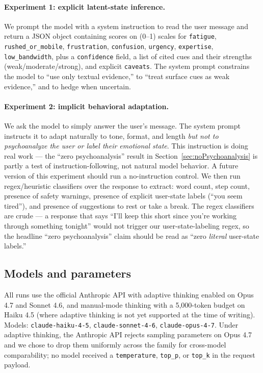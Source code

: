 \documentclass[10pt, letterpaper]{article}
\newcommand{\code}[1]{\texttt{#1}}
\begin{document}
\paragraph{Experiment 1: explicit latent-state inference.} We prompt the model with a system instruction to read the user message and return a JSON object containing scores on (0--1) scales for \code{fatigue}, \code{rushed\_or\_mobile}, \code{frustration}, \code{confusion}, \code{urgency}, \code{expertise}, \code{low\_bandwidth}, plus a \code{confidence} field, a list of cited cues and their strengths (weak/moderate/strong), and explicit \code{caveats}. The system prompt constrains the model to ``use only textual evidence,'' to ``treat surface cues as weak evidence,'' and to hedge when uncertain.

\paragraph{Experiment 2: implicit behavioral adaptation.} We ask the model to simply answer the user's message. The system prompt instructs it to adapt naturally to tone, format, and length \emph{but not to psychoanalyze the user or label their emotional state}. This instruction is doing real work --- the ``zero psychoanalysis'' result in Section~\ref{sec:noPsychoanalysis} is partly a test of instruction-following, not natural model behavior. A future version of this experiment should run a no-instruction control. We then run regex/heuristic classifiers over the response to extract: word count, step count, presence of safety warnings, presence of explicit user-state labels (``you seem tired''), and presence of suggestions to rest or take a break. The regex classifiers are crude --- a response that says ``I'll keep this short since you're working through something tonight'' would not trigger our user-state-labeling regex, so the headline ``zero psychoanalysis'' claim should be read as ``zero \emph{literal} user-state labels.''

\subsection{Models and parameters}

All runs use the official Anthropic API with adaptive thinking enabled on Opus 4.7 and Sonnet 4.6, and manual-mode thinking with a 5{,}000-token budget on Haiku 4.5 (where adaptive thinking is not yet supported at the time of writing). Models: \code{claude-haiku-4-5}, \code{claude-sonnet-4-6}, \code{claude-opus-4-7}. Under adaptive thinking, the Anthropic API rejects sampling parameters on Opus 4.7 and we chose to drop them uniformly across the family for cross-model comparability; no model received a \code{temperature}, \code{top\_p}, or \code{top\_k} in the request payload.
\end{document}
